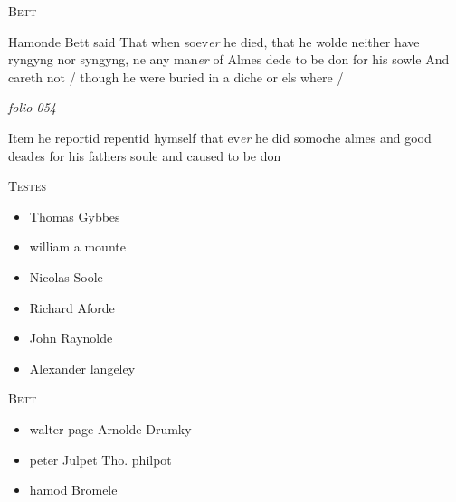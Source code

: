 \documentclass[12pt, a4paper]{book}
\begin{document}
				\begin{center}  {\scshape Bett}  \end{center}
			
               	
               		
				\marginpar[\vspace{0.5cm}{\textcolor{Gray}{offensive}}]{}
			
               		
		\ifthenelse{\isodd{\thepage}}
		{\reversemarginpar}
		{\normalmarginpar}
		Hamonde Bett said That when soev\textit{er} he died, that
 he wolde neither have ryngyng nor syngyng, ne
 any man\textit{er} of Almes dede to be don for his sowle
 And careth not / though he were buried in a diche
 or els where /
               	



\dotfill
						\newpage
{}

\textit{folio 054}



	
		
		\ifthenelse{\isodd{\thepage}}
		{\reversemarginpar}
		{\normalmarginpar}
		Item he reportid repentid hymself that ev\textit{er} he did
 somoche almes and good dead\textit{e}s for his fathers soule
 and caused to be don
	

	\begin{center} {\scshape Testes} \end{center}\begin{itemize}
		
		\item[]Thomas Gybbes
		\item[]william a mounte
		\item[]Nicolas Soole
		\item[]Richard Aforde
		\item[]John Raynolde
		\item[]Alexander langeley
	\end{itemize}
	
	\begin{center} {\scshape Bett} \end{center}\begin{itemize}
		
		\item[]walter page Arnolde Drumky
		\item[]peter Julpet Tho. philpot
		\item[]hamod Bromele
	\end{itemize}
\end{document}
